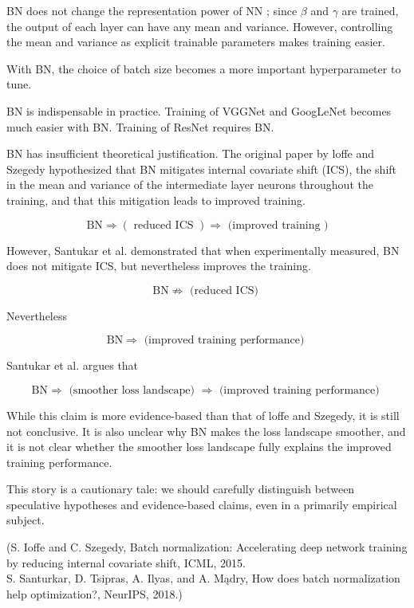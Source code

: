 \begin{concept}[6.49][Efficiency of BN]
    BN does not change the representation power of NN ; since $\beta$ and $\gamma$ are trained, the output of each layer can have any mean and variance. However, controlling the mean and variance as explicit trainable parameters makes training easier.

    With BN, the choice of batch size becomes a more important hyperparameter to tune.

    BN is indispensable in practice. Training of VGGNet and GoogLeNet becomes much easier with BN. Training of ResNet requires BN.
\end{concept}

\begin{concept}
    BN has insufficient theoretical justification.
    The original paper by loffe and Szegedy hypothesized that BN mitigates internal covariate shift (ICS), the shift in the mean and variance of the intermediate layer neurons throughout the training, and that this mitigation leads to improved training.

    $$
    \mathrm{BN} \Rightarrow(\text { reduced ICS }) \Rightarrow \text { (improved training })
    $$

    However, Santukar et al. demonstrated that when experimentally measured, BN does not mitigate ICS, but nevertheless improves the training.

    $$
    \mathrm{BN} \nRightarrow \text { (reduced ICS) }
    $$

    Nevertheless

    $$
    \mathrm{BN} \Rightarrow \text { (improved training performance) }
    $$

    Santukar et al. argues that

    $$
    \mathrm{BN} \Rightarrow \text { (smoother loss landscape) } \Rightarrow \text { (improved training performance) }
    $$

    While this claim is more evidence-based than that of loffe and Szegedy, it is still not conclusive. It is also unclear why BN makes the loss landscape smoother, and it is not clear whether the smoother loss landscape fully explains the improved training performance.

    This story is a cautionary tale: we should carefully distinguish between speculative hypotheses and evidence-based claims, even in a primarily empirical subject.

    (S. Ioffe and C. Szegedy, Batch normalization: Accelerating deep network training by reducing internal covariate shift, ICML, 2015.\\
    S. Santurkar, D. Tsipras, A. Ilyas, and A. Mądry, How does batch normalization help optimization?, NeurIPS, 2018.)
\end{concept}

